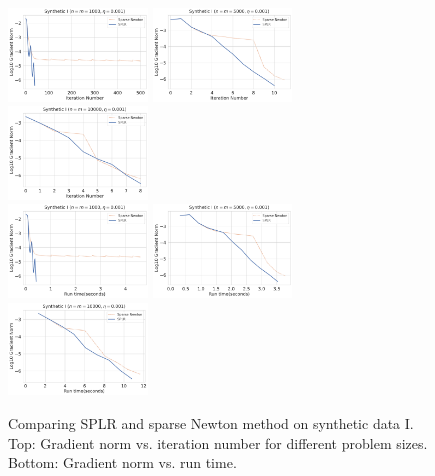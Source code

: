 \documentclass{article}
\theoremstyle{plain}
\theoremstyle{definition}
\theoremstyle{remark}
\begin{document}
\begin{figure}[h]
    \centering
    \includegraphics[width=0.33\textwidth]{save/Synthetic I - Ablation/iterations/n=1000, m=1000, reg=0.001}
    \includegraphics[width=0.33\textwidth]{save/Synthetic I - Ablation/iterations/n=5000, m=5000, reg=0.001}
    \includegraphics[width=0.33\textwidth]{save/Synthetic I - Ablation/iterations/n=10000, m=10000, reg=0.001} \\
    \includegraphics[width=0.33\textwidth]{save/Synthetic I - Ablation/run_times/n=1000, m=1000, reg=0.001}
    \includegraphics[width=0.33\textwidth]{save/Synthetic I - Ablation/run_times/n=5000, m=5000, reg=0.001}
    \includegraphics[width=0.33\textwidth]{save/Synthetic I - Ablation/run_times/n=10000, m=10000, reg=0.001}
    \caption{Comparing SPLR and sparse Newton method on synthetic data I. Top: Gradient norm vs. iteration number for different problem sizes. Bottom: Gradient norm vs. run time.}
    \label{fig:effect_low_rank_i}
\end{figure}
\end{document}
